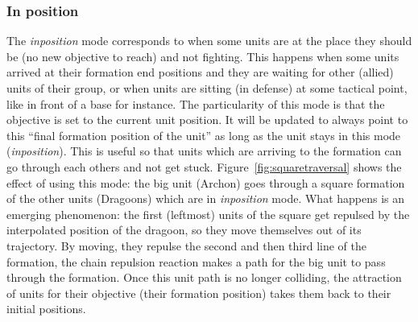 \subsubsection{In position}

The \textit{inposition} mode corresponds to when some units are at the place they should be (no new objective to reach) and not fighting. This happens when some units arrived at their formation end positions and they are waiting for other (allied) units of their group, or when units are sitting (in defense) at some tactical point, like in front of a base for instance. The particularity of this mode is that the objective is set to the current unit position. It will be updated to always point to this ``final formation position of the unit'' as long as the unit stays in this mode (\textit{inposition}). This is useful so that units which are arriving to the formation can go through each others and not get stuck. Figure~\ref{fig:squaretraversal} shows the effect of using this mode: the big unit (Archon) goes through a square formation of the other units (Dragoons) which are in \textit{inposition} mode. What happens is an emerging phenomenon: the first (leftmost) units of the square get repulsed by the interpolated position of the dragoon, so they move themselves out of its trajectory. By moving, they repulse the second and then third line of the formation, the chain repulsion reaction makes a path for the big unit to pass through the formation. Once this unit path is no longer colliding, the attraction of units for their objective (their formation position) takes them back to their initial positions.

